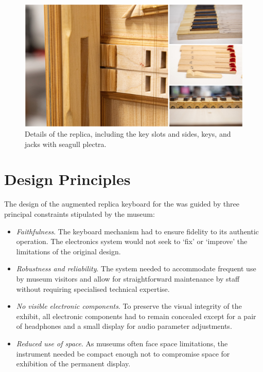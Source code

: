 \begin{figure}
\centering
\includegraphics[width=0.8\linewidth]{src/images/details.jpg}
\caption{Details of the replica, including the key slots and sides, keys, and jacks with seagull plectra.}
\label{fig:details}
\end{figure}

\section{Design Principles}\label{design}

The design of the augmented replica keyboard for the  was guided by three principal constraints stipulated by the museum:

\begin{itemize}
    \item \emph{Faithfulness}. The keyboard mechanism had to ensure fidelity to its authentic operation. The electronics system would not seek to `fix' or `improve' the limitations of the original design.     
    \item \emph{Robustness and reliability}. The system needed to accommodate frequent use by museum visitors and allow for straightforward maintenance by staff without requiring specialised technical expertise.
    \item \emph{No visible electronic components}. To preserve the visual integrity of the exhibit, all electronic components had to remain concealed except for a pair of headphones and a small display for audio parameter adjustments.
    \item \emph{Reduced use of space}. As museums often face space limitations, the instrument needed be compact enough not to compromise space for exhibition of the permanent display. 
\end{itemize}


